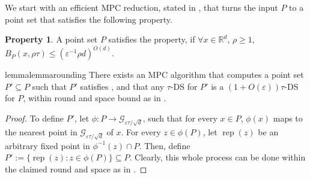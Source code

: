 \documentclass[11pt,letterpaper]{article}
\theoremstyle{plain}
\theoremstyle{definition}
\newtheorem{property}[theorem]{Property}
\theoremstyle{remark}
\DeclareMathOperator*{\rep}{rep}
\renewcommand{\epsilon}{\ensuremath{\varepsilon}}
\let\epsilon\varepsilon
\begin{document}
We start with an efficient MPC reduction, stated in , that turns the input $P$ to a point set that satisfies the following property.
\begin{property}
    \label{prop:packing}
    A point set $P$ satisfies the property, if $\forall x \in \mathbb{R}^d$, $\rho \geq 1$, $B_P(x, \rho\tau) \leq (\epsilon^{-1}\rho d)^{O(d)}$.
\end{property}
\begin{restatable}{lemma}{lemmarounding}
    \label{lemma:rounding}
    There exists an MPC algorithm that computes a point set $P' \subseteq P$ such that $P'$ satisfies ,
    and that any $\tau$-DS for $P'$ is a $(1 + O(\epsilon))\tau$-DS for $P$,
    within round and space bound as in .
\end{restatable}
    \begin{proof}
        To define $P'$, let $\phi : P \to \mathcal{G}_{\epsilon \tau / \sqrt{d}}$,
        such that for every $x \in P$, $\phi(x)$ maps to the nearest point in $\mathcal{G}_{\epsilon \tau / \sqrt{d}}$ of $x$.
        For every $z \in \phi(P)$, let $\rep(z)$ be an arbitrary fixed point in $\phi^{-1}(z) \cap P$.
        Then, define $P' := \{ \rep(z) : z \in \phi(P) \} \subseteq P$.
        Clearly, this whole process can be done within the claimed round and space as in .
        

\end{proof}
\end{document}
